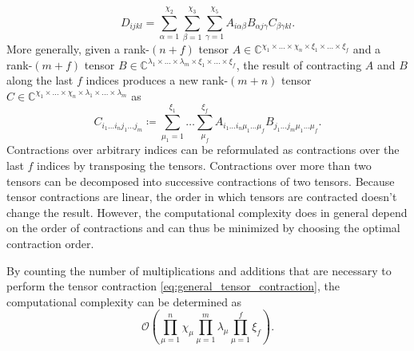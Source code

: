 \begin{equation}
	\label{eq:example_tensor_network_involved_network}
	D_{ijkl} = \sum_{\alpha=1}^{\chi_2} \sum_{\beta=1}^{\chi_3} \sum_{\gamma=1}^{\chi_5} A_{i \alpha \beta} B_{\alpha j\gamma} C_{\beta \gamma k l}.
\end{equation}
More generally, given a rank-$(n+f)$ tensor $A \in \mathbb{C}^{\chi_1\times\dots\times\chi_n\times\xi_{1}\times\dots\times\xi_{f}}$ and a rank-$(m+f)$ tensor $B \in \mathbb{C}^{\lambda_1\times\dots\times\lambda_m\times\xi_1\times\dots\times\xi_f}$, the result of contracting $A$ and $B$ along the last $f$ indices produces a new rank-$(m+n)$ tensor $C \in \mathbb{C}^{\chi_1\times\dots\times\chi_n\times\lambda_1\times\dots\times\lambda_m}$ as
\begin{equation}
	\label{eq:general_tensor_contraction}
	C_{i_1\dots i_nj_1\dots j_m} \coloneqq \sum_{\mu_1 = 1}^{\xi_1} \dots \sum_{\mu_f}^{\xi_f} A_{i_1\dots i_n\mu_1\dots\mu_f} B_{j_1\dots j_m\mu_1\dots\mu_f}.
\end{equation}
Contractions over arbitrary indices can be reformulated as contractions over the last $f$ indices by transposing the tensors. Contractions over more than two tensors can be decomposed into successive contractions of two tensors. Because tensor contractions are linear, the order in which tensors are contracted doesn't change the result. However, the computational complexity does in general depend on the order of contractions and can thus be minimized by choosing the optimal contraction order.\par
By counting the number of multiplications and additions that are necessary to perform the tensor contraction \eqref{eq:general_tensor_contraction}, the computational complexity can be determined as
\begin{equation}
	\label{eq:tensor_contraction_general_computational_complexity}
	\mathcal{O}\left(\prod_{\mu=1}^{n}\chi_\mu \prod_{\mu=1}^{m}\lambda_\mu \prod_{\mu=1}^{f}\xi_f\right).
\end{equation}
